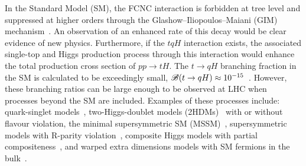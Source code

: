 In the Standard Model (SM), the FCNC interaction is forbidden at tree level and suppressed at higher orders through the Glashow--Iliopoulos--Maiani (GIM) mechanism~\cite{Glashow:1970gm}. An observation of an enhanced rate of this decay would be clear evidence of new physics.
Furthermore, if the $tqH$ interaction exists, the associated single-top and  Higgs  production process through this interaction would enhance
the total production cross section of $pp\rightarrow tH$.
The $t\to qH$ branching fraction in the SM is calculated to be exceedingly small, $\mathscr{B}(t\to qH)\approx10^{-15}$~\cite{Eilam:1990zc,Mele:1998ag,AguilarSaavedra:2004wm,Zhang:2013xya}. 
However, these branching ratios can be large enough to be observed at LHC 
when processes beyond the SM are included. Examples of these processes include: quark-singlet models~\cite{AguilarSaavedra:2002kr}, two-Higgs-doublet models (2HDMs)~\cite{ Branco:2hdm2012} with or without flavour violation,
the minimal supersymmetric SM (MSSM)~\cite{Bejar:2000ub, Guasch:1999jp,Cao:2007dk,Cao:2014udj},
supersymmetric models with R-parity violation~\cite{Eilam:2001dh}, composite Higgs models with partial  compositeness~\cite{Azatov:2014lha}, 
and warped extra dimensions models with SM fermions in the bulk~\cite{Azatov:2009na}. 
